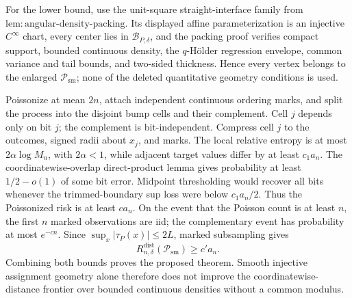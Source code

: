 For the lower bound, use the unit-square straight-interface family from \(\mathrm{lem:angular\text{-}density\text{-}packing}\).  Its displayed affine parameterization is an injective \(C^\infty\) chart, every center lies in \(\mathcal B_{P,\delta}\), and the packing proof verifies compact support, bounded continuous density, the \(q\)-H\"older regression envelope, common variance and tail bounds, and two-sided thickness.  Hence every vertex belongs to the enlarged \(\mathcal P_{\mathrm{sm}}\); none of the deleted quantitative geometry conditions is used.

Poissonize at mean \(2n\), attach independent continuous ordering marks, and split the process into the disjoint bump cells and their complement.  Cell \(j\) depends only on bit \(j\); the complement is bit-independent.  Compress cell \(j\) to the outcomes, signed radii about \(x_j\), and marks.  The local relative entropy is at most \(2\alpha\log M_n\), with \(2\alpha<1\), while adjacent target values differ by at least \(c_1a_n\).  The coordinatewise-overlap direct-product lemma gives probability at least \(1/2-o(1)\) of some bit error.  Midpoint thresholding would recover all bits whenever the trimmed-boundary sup loss were below \(c_1a_n/2\).  Thus the Poissonized risk is at least \(ca_n\).  On the event that the Poisson count is at least \(n\), the first \(n\) marked observations are iid; the complementary event has probability at most \(e^{-cn}\).  Since \(\sup_x|\tau_P(x)|\leq2L\), marked subsampling gives
\[
R_{n,\delta}^{\mathrm{dist}}(\mathcal P_{\mathrm{sm}})\geq c'a_n.
\]
Combining both bounds proves the proposed theorem.  Smooth injective assignment geometry alone therefore does not improve the coordinatewise-distance frontier over bounded continuous densities without a common modulus.